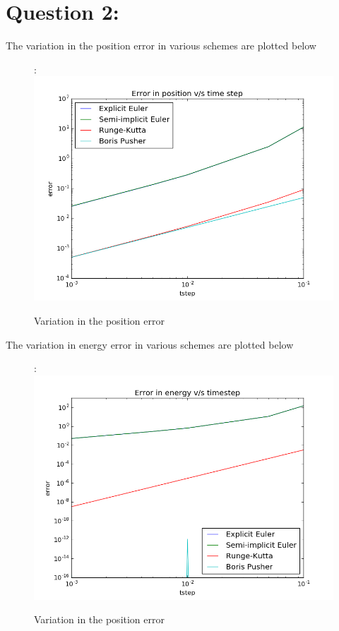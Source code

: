 \documentclass[11pt, a4paper]{article}
\begin{document}
\section{Question 2:}
The variation in the position error in various schemes are plotted below
\begin{figure}:
 \centering
 \includegraphics[scale = 0.5]{Pos_err.png}
 \caption{Variation in the position error}
\end{figure}

The variation in energy error in various schemes are plotted below
\begin{figure}:
 \centering
 \includegraphics[scale = 0.5]{Energy_err.png}
 \caption{Variation in the position error}
\end{figure}
\end{document}
